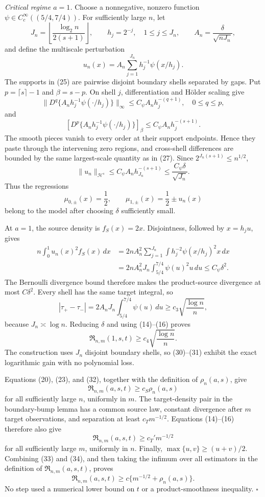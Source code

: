\emph{Critical regime \(a=1\).}
Choose a nonnegative, nonzero function \(\psi\in C_c^\infty((5/4,7/4))\).  For sufficiently large \(n\), let
\[
J_n=\left\lfloor\frac{\log_2 n}{2(s+1)}\right\rfloor,
\qquad
h_j=2^{-j},\quad 1\le j\le J_n,
\qquad
A_n=\frac{\delta}{\sqrt{nJ_n}},
\tag{24}
\]
and define the multiscale perturbation
\[
u_n(x)=A_n\sum_{j=1}^{J_n}h_j^{-1}\psi(x/h_j).
\tag{25}
\]
The supports in (25) are pairwise disjoint boundary shells separated by gaps.  Put \(p=\lceil s\rceil-1\) and \(\beta=s-p\).  On shell \(j\), differentiation and H\"older scaling give
\[
\lVert D^q\{A_nh_j^{-1}\psi(\cdot/h_j)\}\rVert_\infty
\le C_\psi A_nh_j^{-(q+1)},\quad 0\le q\le p,
\tag{26}
\]
and
\[
[D^p\{A_nh_j^{-1}\psi(\cdot/h_j)\}]_\beta
\le C_\psi A_nh_j^{-(s+1)}.
\tag{27}
\]
The smooth pieces vanish to every order at their support endpoints.  Hence they paste through the intervening zero regions, and cross-shell differences are bounded by the same largest-scale quantity as in (27).  Since \(2^{J_n(s+1)}\le n^{1/2}\),
\[
\lVert u_n\rVert_{\mathcal H^s}
\le C_\psi A_nh_{J_n}^{-(s+1)}
\le \frac{C_\psi\delta}{\sqrt{J_n}}.
\tag{28}
\]
Thus the regressions
\[
\mu_{0,\pm}(x)=\frac12,
\qquad
\mu_{1,\pm}(x)=\frac12\pm u_n(x)
\tag{29}
\]
belong to the model after choosing \(\delta\) sufficiently small.

At \(a=1\), the source density is \(f_S(x)=2x\).  Disjointness, followed by \(x=h_ju\), gives
\[
\begin{aligned}
n\int_0^1u_n(x)^2f_S(x)\,dx
&=2nA_n^2\sum_{j=1}^{J_n}
\int h_j^{-2}\psi(x/h_j)^2x\,dx\\
&=2nA_n^2J_n\int_{5/4}^{7/4}\psi(u)^2u\,du
\le C_\psi\delta^2.
\end{aligned}
\tag{30}
\]
The Bernoulli divergence bound therefore makes the product-source divergence at most \(C\delta^2\).  Every shell has the same target integral, so
\[
|\tau_+-\tau_-|
=2A_nJ_n\int_{5/4}^{7/4}\psi(u)\,du
\ge c_3\sqrt{\frac{\log n}{n}},
\tag{31}
\]
because \(J_n\asymp\log n\).  Reducing \(\delta\) and using (14)--(16) proves
\[
\mathfrak R_{n,m}(1,s,t)
\ge c_4\sqrt{\frac{\log n}{n}}.
\tag{32}
\]
The construction uses \(J_n\) disjoint boundary shells, so (30)--(31) exhibit the exact logarithmic gain with no polynomial loss.

Equations (20), (23), and (32), together with the definition of \(\rho_n(a,s)\), give
\[
\mathfrak R_{n,m}(a,s,t)\ge c_S\rho_n(a,s)
\tag{33}
\]
for all sufficiently large \(n\), uniformly in \(m\).  The target-density pair in the boundary-bump lemma has a common source law, constant divergence after \(m\) target observations, and separation at least \(c_Tm^{-1/2}\).  Equations (14)--(16) therefore also give
\[
\mathfrak R_{n,m}(a,s,t)\ge c_T'm^{-1/2}
\tag{34}
\]
for all sufficiently large \(m\), uniformly in \(n\).  Finally, \(\max\{u,v\}\ge(u+v)/2\).  Combining (33) and (34), and then taking the infimum over all estimators in the definition of \(\mathfrak R_{n,m}(a,s,t)\), proves
\[
\mathfrak R_{n,m}(a,s,t)
\ge c\{m^{-1/2}+\rho_n(a,s)\}.
\]
No step used a numerical lower bound on \(t\) or a product-smoothness inequality. \(\square\)